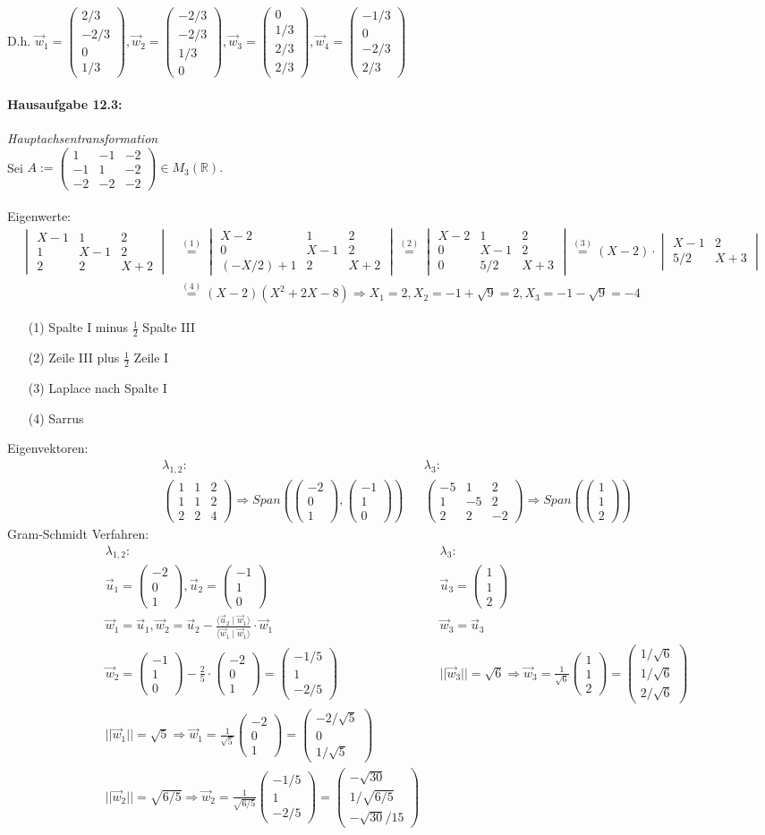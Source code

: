 \documentclass[titlepage]{article}
\newcommand{\R}{\mathbb{R}}
\newcommand{\1}{\mathbb{1}}
\newcommand{\0}{\mathbb{0}}
\newcommand{\vecV}[4]{\left(\begin{smallmatrix}#1\\#2\\#3\\#4\end{smallmatrix}\right)}
\newcommand{\smallMatrixD}[9]{\left(\begin{smallmatrix}#1&#2&#3\\#4&#5&#6\\#7&#8&#9\end{smallmatrix}\right)}
\newcommand{\vecD}[3]{\left(\begin{smallmatrix}#1\\#2\\#3\end{smallmatrix}\right)}
\newcommand{\detZ}[4]{\begin{vmatrix}#1&#2\\#3&#4\end{vmatrix}}
\newcommand{\detD}[9]{\begin{vmatrix}#1&#2&#3\\#4&#5&#6\\#7&#8&#9\end{vmatrix}}
\newcommand{\matrixD}[9]{\begin{pmatrix}#1&#2&#3\\#4&#5&#6\\#7&#8&#9\end{pmatrix}}
\newcommand{\skalarProdukt}[2]{\langle#1\mid#2\rangle}
\begin{document}
	D.h. $\vec{w}_1=\vecV{2/3}{-2/3}{0}{1/3},\vec{w}_2=\vecV{-2/3}{-2/3}{1/3}{0},\vec{w}_3=\vecV{0}{1/3}{2/3}{2/3},\vec{w}_4=\vecV{-1/3}{0}{-2/3}{2/3}$
	
	\paragraph{Hausaufgabe 12.3:} \textit{Hauptachsentransformation} \\ Sei $A:=\smallMatrixD{1}{-1}{-2}{-1}{1}{-2}{-2}{-2}{-2}\in M_3(\R).$\\\\
	Eigenwerte:
	\begin{align*}
		\detD{X-1}{1}{2}{1}{X-1}{2}{2}{2}{X+2}&\overset{(1)}{=}\detD{X-2}{1}{2}{0}{X-1}{2}{(-X/2)+1}{2}{X+2}\overset{(2)}{=}\detD{X-2}{1}{2}{0}{X-1}{2}{0}{5/2}{X+3}\overset{(3)}{=}(X-2)\cdot\detZ{X-1}{2}{5/2}{X+3}\\
		&\overset{(4)}{=}(X-2)(X^2+2X-8)\Rightarrow X_1=2,X_2=-1+\sqrt{9}=2,X_3=-1-\sqrt{9}=-4
	\end{align*}
	\begin{enumerate}
		\item[(1)] Spalte I minus $\frac{1}{2}$ Spalte III
		\item[(2)] Zeile III plus $\frac{1}{2}$ Zeile I
		\item[(3)] Laplace nach Spalte I
		\item[(4)] Sarrus
	\end{enumerate}
	Eigenvektoren:
	\begin{align*}
		&\lambda_{1,2}: & &\lambda_3:\\
		&\matrixD{1}{1}{2}{1}{1}{2}{2}{2}{4}\Rightarrow Span(\vecD{-2}{0}{1},\vecD{-1}{1}{0}) & &\matrixD{-5}{1}{2}{1}{-5}{2}{2}{2}{-2}\Rightarrow Span(\vecD{1}{1}{2})
	\end{align*}
	\noindent
	Gram-Schmidt Verfahren:
	\begin{align*}
		&\lambda_{1,2}: & &\lambda_3:\\
		&\vec{u}_1=\vecD{-2}{0}{1},\vec{u}_2=\vecD{-1}{1}{0} & &\vec{u}_3=\vecD{1}{1}{2}\\
		&\vec{w}_1=\vec{u}_1,\vec{w}_2=\vec{u}_2-\frac{\skalarProdukt{\vec{u}_2}{\vec{w}_1}}{\skalarProdukt{\vec{w}_1}{\vec{w}_1}}\cdot\vec{w}_1 & &\vec{w}_3=\vec{u}_3\\
		&\vec{w}_2=\vecD{-1}{1}{0}-\frac{2}{5}\cdot\vecD{-2}{0}{1}=\vecD{-1/5}{1}{-2/5} & &||\vec{w}_3||=\sqrt{6}\Rightarrow\vec{w}_3=\frac{1}{\sqrt{6}}\vecD{1}{1}{2}=\vecD{1/\sqrt{6}}{1/\sqrt{6}}{2/\sqrt{6}}\\
		&||\vec{w}_1||=\sqrt{5}\Rightarrow\vec{w}_1=\frac{1}{\sqrt{5}}\vecD{-2}{0}{1}=\vecD{-2/\sqrt{5}}{0}{1/\sqrt{5}} &&\\
		&||\vec{w}_2||=\sqrt{6/5}\Rightarrow\vec{w}_2=\frac{1}{\sqrt{6/5}}\vecD{-1/5}{1}{-2/5}=\vecD{-\sqrt{30}}{1/\sqrt{6/5}}{-\sqrt{30}/15}
	\end{align*}
\end{document}
